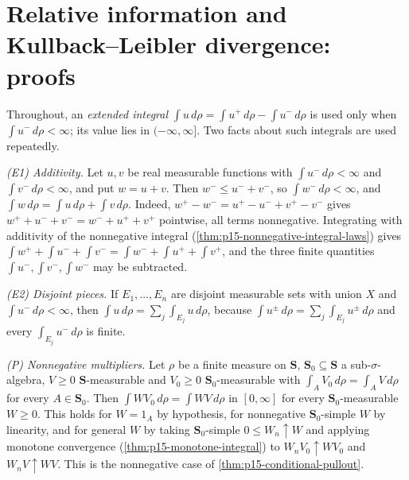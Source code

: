 \section{Relative information and Kullback--Leibler divergence: proofs}
\label{sec:annex-p15-w02b-p15-045-relative-information}

Throughout, an \emph{extended integral} \(\int u\,d\rho=\int u^+\,d\rho-\int u^-\,d\rho\)
is used only when \(\int u^-\,d\rho<\infty\); its value lies in
\((-\infty,\infty]\). Two facts about such integrals are used repeatedly.

\emph{(E1) Additivity.} Let \(u,v\) be real measurable functions with
\(\int u^-\,d\rho<\infty\) and \(\int v^-\,d\rho<\infty\), and put
\(w=u+v\). Then \(w^-\leq u^-+v^-\), so \(\int w^-\,d\rho<\infty\), and
\(\int w\,d\rho=\int u\,d\rho+\int v\,d\rho\). Indeed,
\(w^+-w^-=u^+-u^-+v^+-v^-\) gives
\(w^++u^-+v^-=w^-+u^++v^+\) pointwise, all terms nonnegative.
Integrating with additivity of the nonnegative integral
(\cref{thm:p15-nonnegative-integral-laws}) gives
\(\int w^++\int u^-+\int v^-=\int w^-+\int u^++\int v^+\), and the three
finite quantities \(\int u^-,\int v^-,\int w^-\) may be subtracted.

\emph{(E2) Disjoint pieces.} If \(E_1,\dots,E_n\) are disjoint measurable
sets with union \(X\) and \(\int u^-\,d\rho<\infty\), then
\(\int u\,d\rho=\sum_j\int_{E_j}u\,d\rho\), because
\(\int u^\pm\,d\rho=\sum_j\int_{E_j}u^\pm\,d\rho\) and every
\(\int_{E_j}u^-\,d\rho\) is finite.

\emph{(P) Nonnegative multipliers.} Let \(\rho\) be a finite measure on
\(\mathbf S\), \(\mathbf S_0\subseteq\mathbf S\) a sub-\(\sigma\)-algebra,
\(V\geq0\) \(\mathbf S\)-measurable and \(V_0\geq0\)
\(\mathbf S_0\)-measurable with \(\int_AV_0\,d\rho=\int_AV\,d\rho\) for
every \(A\in\mathbf S_0\). Then \(\int WV_0\,d\rho=\int WV\,d\rho\) in
\([0,\infty]\) for every \(\mathbf S_0\)-measurable \(W\geq0\). This holds
for \(W=1_A\) by hypothesis, for nonnegative \(\mathbf S_0\)-simple \(W\)
by linearity, and for general \(W\) by taking \(\mathbf S_0\)-simple
\(0\leq W_n\uparrow W\) and applying monotone convergence
(\cref{thm:p15-monotone-integral}) to \(W_nV_0\uparrow WV_0\) and
\(W_nV\uparrow WV\). This is the nonnegative case of
\cref{thm:p15-conditional-pullout}.

